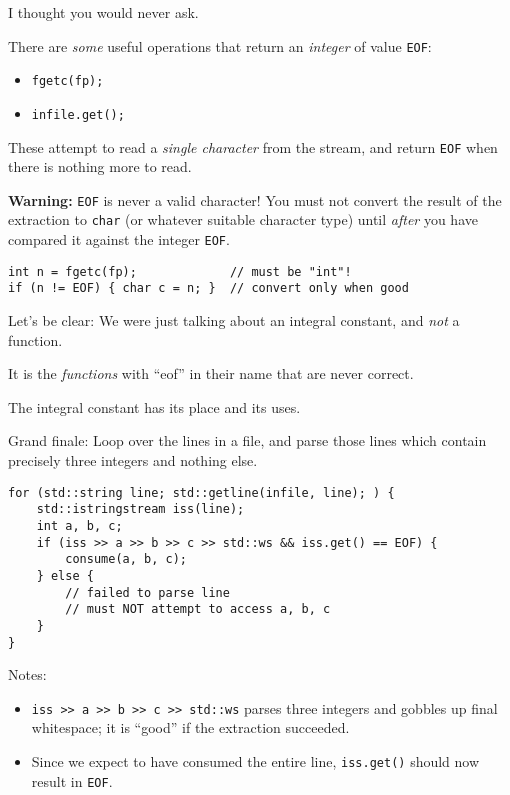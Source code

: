 \documentclass[landscape,a4paper]{article}
\newenvironment{vcframe}{%
\begin{titlepage}
\vspace*{\fill}}{%
\vspace*{\parskip}%
\vspace*{\fill}
\end{titlepage}}
\begin{document}
\begin{vcframe}\center
I thought you would never ask.
\end{vcframe}

\begin{vcframe}
\setlength{\parskip}{1\baselineskip}
There are \emph{some} useful operations that return an \emph{integer} of value \texttt{EOF}:
\begin{itemize}
\item \texttt{fgetc(fp);}
\item \texttt{infile.get();}
\end{itemize}
These attempt to read a \emph{single character} from the stream, and return \texttt{EOF} when there is nothing more to read.

\textbf{Warning:} \texttt{EOF} is never a valid character! You must not convert the result of the extraction to \texttt{char} (or whatever suitable character type) until \emph{after} you have compared it against the integer \texttt{EOF}.
{\small\begin{verbatim}
int n = fgetc(fp);             // must be "int"!
if (n != EOF) { char c = n; }  // convert only when good
\end{verbatim}}
\end{vcframe}

\begin{vcframe}\center
Let's be clear: We were just talking about an integral constant, and \emph{not} a function.

It is the \emph{functions} with ``eof'' in their name that are never correct.

The integral constant has its place and its uses.
\end{vcframe}

\begin{vcframe}
\setlength{\parskip}{1\baselineskip}
Grand finale: Loop over the lines in a file, and parse those lines which contain precisely three integers and nothing else.
{\small\begin{verbatim}
for (std::string line; std::getline(infile, line); ) {
    std::istringstream iss(line);
    int a, b, c;
    if (iss >> a >> b >> c >> std::ws && iss.get() == EOF) {
        consume(a, b, c);
    } else {
        // failed to parse line
        // must NOT attempt to access a, b, c
    }
}
\end{verbatim}}
Notes:\vspace{-1em}
\begin{itemize}
\item \texttt{iss >> a >> b >> c >> std::ws} parses three integers and gobbles up final whitespace; it is ``good'' if the extraction succeeded.
\item Since we expect to have consumed the entire line, \texttt{iss.get()} should now result in \texttt{EOF}.
\end{itemize}
\end{vcframe}
\end{document}
